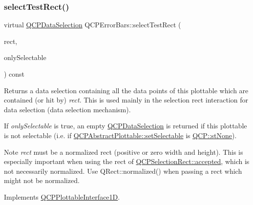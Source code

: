\subsubsection{\texorpdfstring{select\+Test\+Rect()}{selectTestRect()}\hspace{0.1cm}{\footnotesize\ttfamily [1/2]}}
{\footnotesize\ttfamily virtual \hyperlink{class_q_c_p_data_selection}{Q\+C\+P\+Data\+Selection} Q\+C\+P\+Error\+Bars\+::select\+Test\+Rect (\begin{DoxyParamCaption}\item[{const Q\+RectF \&}]{rect,  }\item[{bool}]{only\+Selectable }\end{DoxyParamCaption}) const\hspace{0.3cm}{\ttfamily [virtual]}}

Returns a data selection containing all the data points of this plottable which are contained (or hit by) {\itshape rect}. This is used mainly in the selection rect interaction for data selection (data selection mechanism).

If {\itshape only\+Selectable} is true, an empty \hyperlink{class_q_c_p_data_selection}{Q\+C\+P\+Data\+Selection} is returned if this plottable is not selectable (i.\+e. if \hyperlink{class_q_c_p_abstract_plottable_ac238d6e910f976f1f30d41c2bca44ac3}{Q\+C\+P\+Abstract\+Plottable\+::set\+Selectable} is \hyperlink{namespace_q_c_p_ac6cb9db26a564b27feda362a438db038a2cb7996ccc6c39b9e6d20f2e46bf3f57}{Q\+C\+P\+::st\+None}).

\begin{DoxyNote}{Note}
{\itshape rect} must be a normalized rect (positive or zero width and height). This is especially important when using the rect of \hyperlink{class_q_c_p_selection_rect_a15a43542e1f7b953a44c260b419e6d2c}{Q\+C\+P\+Selection\+Rect\+::accepted}, which is not necessarily normalized. Use {\ttfamily Q\+Rect\+::normalized()} when passing a rect which might not be normalized. 
\end{DoxyNote}


Implements \hyperlink{class_q_c_p_plottable_interface1_d_a67093e4ccf490ff5f7750640941ff34c}{Q\+C\+P\+Plottable\+Interface1D}.

\mbox{\label{class_q_c_p_error_bars_ac32f9e729cb205ca56821f9b663472c0}} 
